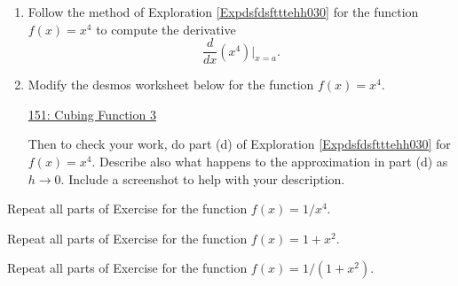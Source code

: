 \documentclass{ximera}
\begin{document}
\begin{exercise}  \label{Exerg4t5677878}
\begin{enumerate}
\item Follow the method of Exploration \ref{Expdsfdsftttehh030} for the function $f(x)=x^4$ to compute the derivative
\[
    \frac{d}{dx}\left( x^4 \right) \Big|_{x=a}.
\]

\item Modify the desmos worksheet below for the function $f(x)=x^4$.

\href{https://www.desmos.com/calculator/8eiffwbgt5}{151: Cubing Function 3}

Then to check your work, do part (d) of Exploration  \ref{Expdsfdsftttehh030} for $f(x)=x^4$. Describe also what happens to the approximation in part (d) as $h\to 0$. Include a screenshot to help with your description.

\end{enumerate}
\end{exercise}

\begin{exercise}  \label{Exe6776654656}
Repeat all parts of Exercise \label{Exerg4t5677878} for the function $f(x)=1/x^4$.
\end{exercise}

\begin{exercise}  \label{Exe677665dfdgfsg56}
Repeat all parts of Exercise \label{Exerg4t5677878} for the function $f(x)=1+x^2$.
\end{exercise}

\begin{exercise}  \label{Exe6776654656}
Repeat all parts of Exercise \label{Exerg4t5dsf4tr4t878} for the function $f(x)=1/(1+x^2)$.
\end{exercise}

\iffalse

**************************************************************

\section{Tangent Lines}

\section{A Geometric Interpretation}

We just saw that
\[ 
       \frac{d}{dx} \left( x^3 \right)\Big|_{x=a} = 4a^3.
\]

Here's a way to think about what this says geometrically.

\begin{onlineOnly}
    \begin{center}
\desmos{bwhvxlapr1}{450}{600}  
\end{center}
\end{onlineOnly}

\href{https://www.desmos.com/calculator/bwhvxlapr1}{Derivative Geometric Meaning}

*************************************************************************
\fi
\end{document}
